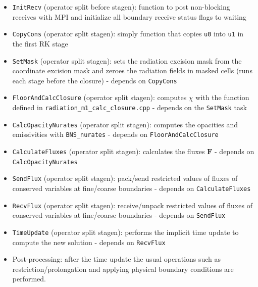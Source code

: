 \documentclass{article}
\newcommand{\var}[1]{%
  {\setlength{\fboxsep}{1.5pt}%
   \colorbox{varbg}{\textcolor{varfg}{\texttt{\small #1}}}}}
\begin{document}
\begin{itemize}
  \item \var{InitRecv} (operator split before stagen): function to post non-blocking receives with MPI and initialize all boundary receive status flags to waiting
  \item \var{CopyCons} (operator split stagen): simply function that copies \var{u0} into \var{u1} in the first RK stage
  \item \var{SetMask} (operator split stagen): sets the radiation excision mask from the coordinate excision mask and zeroes the radiation fields in masked cells (runs each stage
  before the closure) - depends on \var{CopyCons}
  \item \var{FloorAndCalcClosure} (operator split stagen): computes $\chi$ with the function defined in \var{radiation\_m1\_calc\_closure.cpp} - depends on the \var{SetMask} task
  \item \var{CalcOpacityNurates} (operator split stagen): computes the opacities and emissivities with \texttt{BNS\_nurates} - depends on \var{FloorAndCalcClosure}
  \item \var{CalculateFluxes} (operator split stagen): calculates the fluxes $\mathbf{F}$ - depends on \var{CalcOpacityNurates}
  \item \var{SendFlux} (operator split stagen): pack/send restricted values of fluxes of conserved variables at fine/coarse boundaries - depends on \var{CalculateFluxes}
  \item \var{RecvFlux} (operator split stagen): receive/unpack restricted values of fluxes of conserved variables at fine/coarse boundaries - depends on \var{SendFlux}
  \item \var{TimeUpdate} (operator split stagen): performs the implicit time update to compute the new solution - depends on \var{RecvFlux}
  \item Post-processing: after the time update the usual operations such as restriction/prolongation and applying physical boundary conditions are performed.
\end{itemize}
\end{document}
